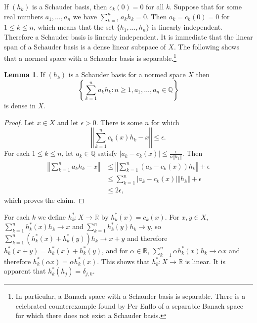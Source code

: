 \documentclass{article}
\newcommand{\norm}[1]{\left\Vert #1 \right\Vert}
\theoremstyle{definition}
\newtheorem{lemma}[theorem]{Lemma}
\theoremstyle{definition}
\begin{document}
If $(h_k)$ is a Schauder basis, then
$c_k(0)=0$ for all $k$. Suppose that for some real numbers $a_1,\ldots,a_n$ we have
  $\sum_{k=1}^n a_k h_k=0$. Then $a_k=c_k(0)=0$ for $1 \leq k \leq n$, which means that the set $\{h_1,\ldots,h_n\}$ is linearly independent. 
Therefore a Schauder basis is linearly independent. 
It is immediate that the linear span of a Schauder basis is a dense linear subspace of $X$. 
The following shows that a normed space with a Schauder basis is separable.\footnote{In particular, a Banach
space with a Schauder basis is separable. There is a celebrated counterexample found by Per Enflo of a separable
Banach space for which there does not exist a Schauder basis.}

\begin{lemma}
If $(h_k)$ is a Schauder basis for a normed space $X$ then
\[
\left\{\sum_{k=1}^n a_k h_k: n \geq 1, a_1,\ldots,a_n \in \mathbb{Q}\right\}
\]
is dense in $X$. 
\end{lemma}
\begin{proof}
Let $x \in X$ and let $\epsilon>0$. There is some $n$ for which 
\[
\norm{\sum_{k=1}^n c_k(x) h_k - x} \leq \epsilon.
\]
For each $1 \leq k \leq n$, let $a_k \in \mathbb{Q}$ satisfy $|a_k-c_k(x)| \leq \frac{\epsilon}{n \norm{h_k}}$. Then
\begin{align*}
\norm{\sum_{k=1}^n a_k h_k -x} &\leq 
\norm{\sum_{k=1}^n (a_k-c_k(x))h_k} + \epsilon\\
&\leq \sum_{k=1}^n |a_k-c_k(x)| \norm{h_k} + \epsilon\\
&\leq 2\epsilon,
\end{align*}
which proves the claim.
\end{proof}


For each $k$ we define $h_k^*:X \to \mathbb{R}$ by $h_k^*(x)=c_k(x)$. 
For $x,y \in X$, $\sum_{k=1}^n h_k^*(x)h_k \to x$ and $\sum_{k=1}^n h_k^*(y)h_k \to y$,
so $\sum_{k=1}^n (h_k^*(x)+h_k^*(y))h_k \to x+y$ and therefore $h_k^*(x+y)=h_k^*(x)+h_k^*(y)$, and for $\alpha \in \mathbb{R}$,
$\sum_{k=1}^n \alpha h_k^*(x) h_k \to \alpha x$ and therefore $h_k^*(\alpha x)=\alpha h_k^*(x)$.
This shows that $h_k^*:X \to \mathbb{R}$ is linear. 
It is apparent that $h_k^*(h_j)=\delta_{j,k}$. 
\end{document}
